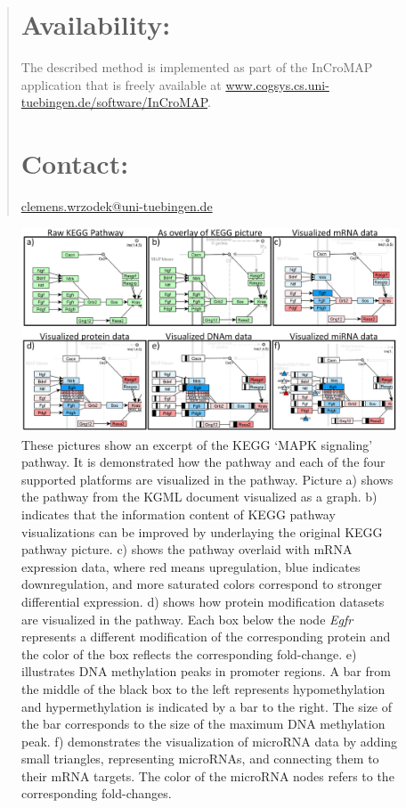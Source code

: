 \documentclass{bioinfo}
\begin{document}
\begin{abstract}
\section{Availability:}
The described method is implemented as part of the InCroMAP application that is freely available at \href{http://www.cogsys.cs.uni-tuebingen.de/software/InCroMAP/}{www.cogsys.cs.uni-tuebingen.de/software/InCroMAP}.


\section{Contact:} \href{mailto:clemens.wrzodek@uni-tuebingen.de}{clemens.wrzodek@uni-tuebingen.de}
\end{abstract}


\begin{figure}[t]
\centering
\includegraphics[width=1.0\textwidth]{figures/visualization-steps.png}
\caption{These pictures show an excerpt of the KEGG `MAPK signaling' pathway. It is demonstrated how the
pathway and each of the four supported platforms are visualized in the pathway. Picture a) shows the
pathway from the KGML document visualized as a graph. b) indicates that the information content of KEGG
pathway visualizations can be improved by underlaying the original KEGG pathway picture. c) shows the
pathway overlaid with mRNA expression data, where red means upregulation, blue indicates downregulation, and
more saturated colors correspond to stronger differential expression. d) shows how protein modification datasets are
visualized in the pathway. Each box below the node \emph{Egfr} represents a different modification of the corresponding
protein and the color of the box reflects the corresponding fold-change. e) illustrates DNA
methylation peaks in promoter regions. A bar from the middle of the black box to the left represents
hypomethylation and hypermethylation is indicated by a bar to the right. The size of the bar
corresponds to the size of the maximum DNA methylation peak. f) demonstrates the visualization of
microRNA data by adding small triangles, representing microRNAs, and connecting them to their mRNA targets.
The color of the microRNA nodes refers to the corresponding fold-changes.}
\label{fig:visualization_steps}
\end{figure}
\end{document}
